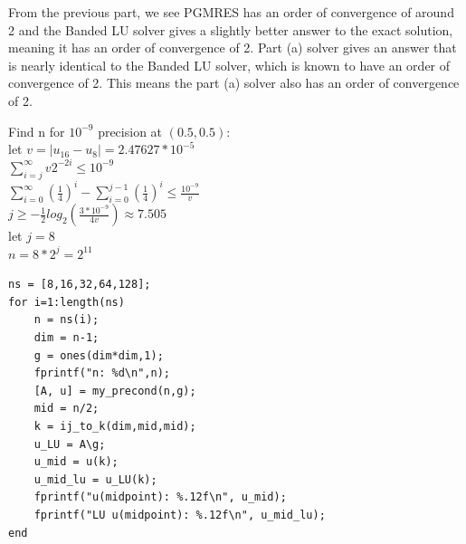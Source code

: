 \documentclass[12pt,letter]{article}
\begin{document}
\begin{enumerate}
\begin{enumerate}
From the previous part, we see PGMRES has an order of convergence of around 2 and the Banded LU solver gives a slightly better answer to the exact solution, meaning it has an order of convergence of 2. Part (a) solver gives an answer that is nearly identical to the Banded LU solver, which is known to have an order of convergence of 2. This means the part (a) solver also has an order of convergence of 2.

Find n for $10^{-9}$ precision at $(0.5,0.5)$:\\

let $v=|u_{16}-u_8|=2.47627*10^{-5}$\\
$\sum_{i=j}^{\infty} v 2^{-2i} \leq 10^{-9}$\\
$\sum_{i=0}^{\infty} (\frac{1}{4})^i - \sum_{i=0}^{j-1} (\frac{1}{4})^i \leq \frac{10^{-9}}{v}$\\
$j \geq -\frac{1}{2}log_2(\frac{3*10^{-9}}{4v}) \approx 7.505$\\
let $j=8$\\
$n=8*2^j=2^{11}$\\

\pagebreak

\begin{verbatim}
ns = [8,16,32,64,128];
for i=1:length(ns)
    n = ns(i);
    dim = n-1;
    g = ones(dim*dim,1);
    fprintf("n: %d\n",n);
    [A, u] = my_precond(n,g);
    mid = n/2;
    k = ij_to_k(dim,mid,mid);
    u_LU = A\g;
    u_mid = u(k);
    u_mid_lu = u_LU(k);
    fprintf("u(midpoint): %.12f\n", u_mid);
    fprintf("LU u(midpoint): %.12f\n", u_mid_lu);
end
\end{verbatim}

\end{enumerate}

\end{enumerate}
\end{document}

